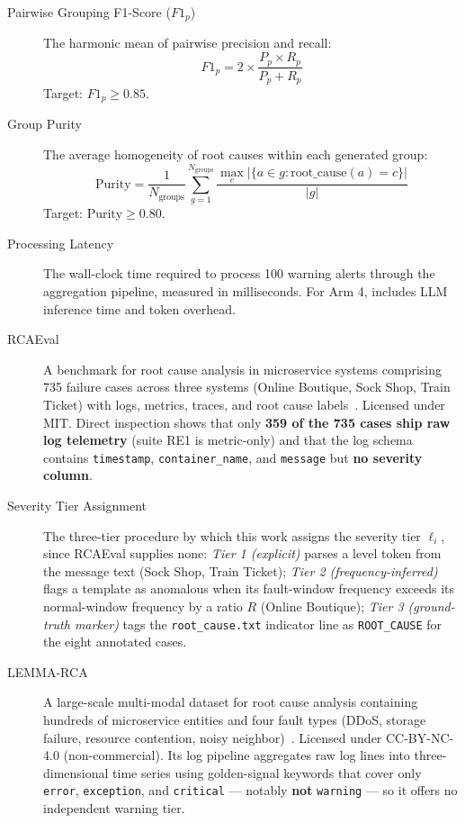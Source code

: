 \begin{description}
\item[Pairwise Grouping F1-Score ($F1_p$)]
The harmonic mean of pairwise precision and recall:
\begin{equation}
F1_p = 2 \times \frac{P_p \times R_p}{P_p + R_p}
\end{equation}
Target: $F1_p \ge 0.85$.

\item[Group Purity]
The average homogeneity of root causes within each generated group:
\begin{equation}
\text{Purity} = \frac{1}{N_{\text{groups}}} \sum_{g=1}^{N_{\text{groups}}} \frac{\max_{c} |\{a \in g : \text{root\_cause}(a) = c\}|}{|g|}
\end{equation}
Target: $\text{Purity} \ge 0.80$.

\item[Processing Latency]
The wall-clock time required to process 100 warning alerts through the aggregation pipeline, measured in milliseconds. For Arm 4, includes LLM inference time and token overhead.


\item[RCAEval]
A benchmark for root cause analysis in microservice systems comprising 735 failure cases across three systems (Online Boutique, Sock Shop, Train Ticket) with logs, metrics, traces, and root cause labels~\cite{pham2025rcaeval}. Licensed under MIT. Direct inspection shows that only \textbf{359 of the 735 cases ship raw log telemetry} (suite RE1 is metric-only) and that the log schema contains \texttt{timestamp}, \texttt{container\_name}, and \texttt{message} but \textbf{no severity column}.

\item[Severity Tier Assignment]
The three-tier procedure by which this work assigns the severity tier $\ell_i$, since RCAEval supplies none: \emph{Tier 1 (explicit)} parses a level token from the message text (Sock Shop, Train Ticket); \emph{Tier 2 (frequency-inferred)} flags a template as anomalous when its fault-window frequency exceeds its normal-window frequency by a ratio $R$ (Online Boutique); \emph{Tier 3 (ground-truth marker)} tags the \texttt{root\_cause.txt} indicator line as \texttt{ROOT\_CAUSE} for the eight annotated cases.

\item[LEMMA-RCA]
A large-scale multi-modal dataset for root cause analysis containing hundreds of microservice entities and four fault types (DDoS, storage failure, resource contention, noisy neighbor)~\cite{zheng2024lemma}. Licensed under CC-BY-NC-4.0 (non-commercial). Its log pipeline aggregates raw log lines into three-dimensional time series using golden-signal keywords that cover only \texttt{error}, \texttt{exception}, and \texttt{critical} --- notably \textbf{not} \texttt{warning} --- so it offers no independent warning tier.


\end{description}

